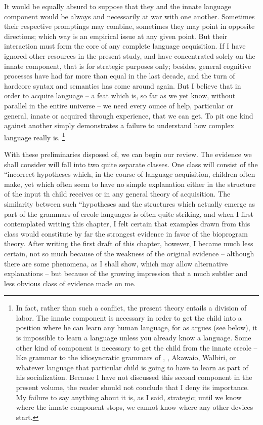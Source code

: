 It would be equally absurd to suppose that they and the innate language component would be always and necessarily at war with one another. Sometimes their respective promptings may combine, sometimes they may point in opposite directions; which way is an empirical issue at any given point. But their interaction must form the core of any complete  language acquisition. If I have ignored other resources in the present study, and have concentrated solely on the innate component, that is for strategic purposes only; besides, general cognitive processes have had far more than equal  in the last decade, and the turn of hardcore syntax and semantics has come around again. But I believe that in order to acquire language -- a feat which is, so far as we yet know, without parallel in the entire universe -- we need every ounce of help, particular or general, innate or acquired through experience, that we can get. To pit one kind against another simply demonstrates a failure to understand how complex language really is.
\footnote{In fact, rather than such a conflict, the present theory entails a division of labor. The innate component is necessary in order to get the child into a position where he can learn any human language, for as \citet{Fodor1975} argues (see below), it is impossible to learn a language unless you already know a language. Some other kind of component is necessary to get the child from the innate creole -- like grammar to the idiosyncratic grammars of , , Akawaio, Walbiri, or whatever language that particular child is going to have to learn as part of his socialization. Because I have not discussed this second component in the present volume, the reader should not conclude that I deny its importance. My failure to say anything about it is, as I said, strategic; until we know where the innate component stops, we cannot know where any other devices start.}

With these preliminaries disposed of, we can begin our review. The evidence we shall consider will fall into two quite separate classes. One class will consist of the ``incorrect hypotheses which, in the course of language acquisition, children often make, yet which often seem to have no simple explanation either in the structure of the input th child receives or in any general theory of acquisition. The similarity between such ``hypotheses and the structures which actually emerge as part of the grammars of creole languages is often quite striking, and when I first contemplated writing this chapter, I felt certain that examples drawn from this class would constitute by far the strongest evidence in favor of the bioprogram theory. After writing the first draft of this chapter, however, I became much less certain, not so much because of the weakness of the original evidence -- although there are some phenomena, as I shall show, which may allow alternative explanations -- but because of the growing impression that a much subtler and less obvious class of evidence made on me.

